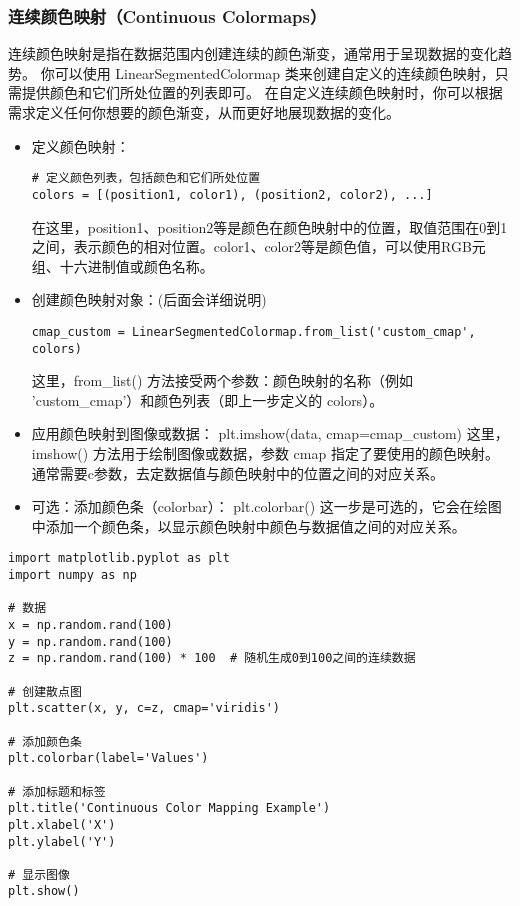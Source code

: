 \documentclass{article}
\begin{document}
\subsubsection{连续颜色映射（Continuous Colormaps）}
连续颜色映射是指在数据范围内创建连续的颜色渐变，通常用于呈现数据的变化趋势。
你可以使用 LinearSegmentedColormap 类来创建自定义的连续颜色映射，只需提供颜色和它们所处位置的列表即可。
在自定义连续颜色映射时，你可以根据需求定义任何你想要的颜色渐变，从而更好地展现数据的变化。
\begin{itemize}
 \item 定义颜色映射：
\begin{lstlisting}[caption={示例Python代码}]
# 定义颜色列表，包括颜色和它们所处位置
colors = [(position1, color1), (position2, color2), ...]
\end{lstlisting}
在这里，position1、position2等是颜色在颜色映射中的位置，取值范围在0到1之间，表示颜色的相对位置。color1、color2等是颜色值，可以使用RGB元组、十六进制值或颜色名称。

 \item 创建颜色映射对象：(后面会详细说明)
 \begin{lstlisting}[caption={示例Python代码}]
cmap_custom = LinearSegmentedColormap.from_list('custom_cmap', colors)
 \end{lstlisting}
这里，from\_list() 方法接受两个参数：颜色映射的名称（例如 'custom\_cmap'）和颜色列表（即上一步定义的 colors）。

\item 应用颜色映射到图像或数据：
plt.imshow(data, cmap=cmap\_custom)
这里，imshow() 方法用于绘制图像或数据，参数 cmap 指定了要使用的颜色映射。通常需要c参数，去定数据值与颜色映射中的位置之间的对应关系。


 \item 可选：添加颜色条（colorbar）：
plt.colorbar()
这一步是可选的，它会在绘图中添加一个颜色条，以显示颜色映射中颜色与数据值之间的对应关系。
\end{itemize}
\begin{lstlisting}[caption={示例Python代码}]
import matplotlib.pyplot as plt
import numpy as np

# 数据
x = np.random.rand(100)
y = np.random.rand(100)
z = np.random.rand(100) * 100  # 随机生成0到100之间的连续数据

# 创建散点图
plt.scatter(x, y, c=z, cmap='viridis')

# 添加颜色条
plt.colorbar(label='Values')

# 添加标题和标签
plt.title('Continuous Color Mapping Example')
plt.xlabel('X')
plt.ylabel('Y')

# 显示图像
plt.show()
\end{lstlisting}
\end{document}
